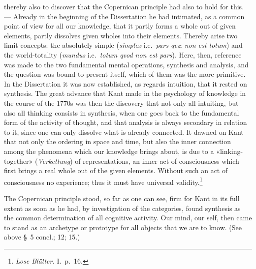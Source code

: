 \documentclass[12pt,a4paper]{article}
\newcommand{\opage}[1]{\marginnote{\footnotesize\textit{[#1]}}}
\begin{document}
thereby also to discover that the Copernican principle had also to hold for
this. --- Already in the beginning of the Dissertation he had intimated, as a
common point of view for all our knowledge, that it partly \opage{54}forms a whole out
of given elements, partly dissolves given wholes into their elements. Thereby
arise two limit-concepts: the absolutely simple (\textit{simplex} i.e.\
\textit{pars qvæ non est totum}) and the world-totality (\textit{mundus}
i.e.\ \textit{totum qvod non est pars}). Here, then, reference was made to
the two fundamental mental operations, synthesis and analysis, and the
question was bound to present itself, which of them was the more primitive. In
the Dissertation it was now established, as regards intuition, that it rested
on synthesis. The great advance that Kant made in the psychology of knowledge
in the course of the 1770s was then the discovery that not only all
intuiting, but also all thinking consists in synthesis, when one goes back to
the fundamental form of the activity of thought, and that analysis is always
secondary in relation to it, since one can only dissolve what is already
connected. It dawned on Kant that not only the ordering in space and time,
but also the inner connection among the phenomena which our knowledge brings
about, is due to a «linking-together» (\textit{Verkettung}) of
representations, an inner act of consciousness which first brings a real
whole out of the given elements. Without such an act of consciousness no
experience; thus it must have universal validity.\footnote{\textit{Lose
Blätter.} I.\ p.\ 16.}

The Copernican principle stood, so far as one can see, firm for Kant in its
full extent as soon as he had, by investigation of the categories, found
synthesis as the common determination of all cognitive activity. Our mind,
our self, then came to stand as an archetype or prototype for all objects
that we are to know. (See above §\ 5 concl.; 12; 15.)
\end{document}
